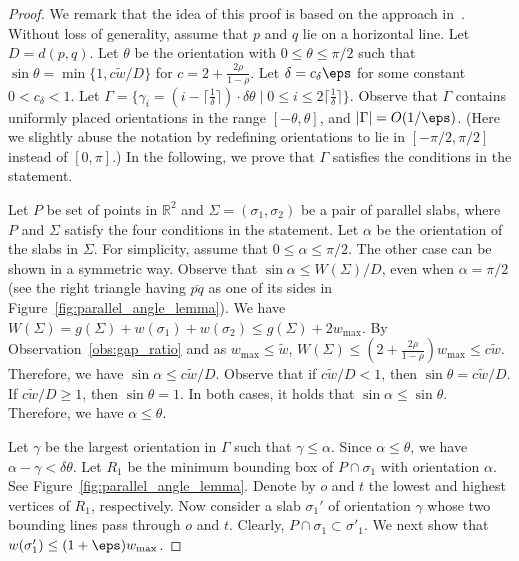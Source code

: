 \begin{proof}
    We remark that the idea of this proof is based on the approach in~\cite{agarwalTwo}.
    Without loss of generality, assume that $p$ and $q$ lie on a horizontal line. 
    Let $D = d(p, q)$. 
    Let $\theta$ be the orientation with $0\le \theta \le \pi/2$ such that $\sin\theta = \min \{1, c \widetilde w/{D} \}$ for $c= 2 + \frac{2\rho}{1-\rho}$.
    Let $\delta =  c_\delta \eps$ for some constant $0 < c_\delta < 1$. 
    Let $\Gamma = \{\gamma_i = (i- \lceil \frac{1}{\delta}\rceil)\cdot \delta\theta  \mid 0 \le i \le 2\lceil \frac{1}{\delta}\rceil \}$.
    Observe that $\Gamma$ contains uniformly placed orientations in the range $[-\theta, \theta]$, and $|\Gamma| = O(1/\eps)$. (Here we slightly abuse the notation by redefining orientations to lie in $[-\pi/2, \pi/2]$ instead of $[0, \pi]$.)
    In the following, we prove that $\Gamma$ satisfies the conditions in the statement.

    Let $P$ be set of points in $\mathbb R^2$ and $\Sigma = (\sigma_1, \sigma_2)$ be a pair of parallel slabs, where $P$ and $\Sigma$ satisfy the four conditions in the statement.
    Let $\alpha$ be the orientation of the slabs in $\Sigma$. 
    For simplicity, assume that $0\le \alpha \le \pi/2$. The other case can be shown in a symmetric way. 
    Observe that $\sin \alpha \le W(\Sigma)/D$, even when $\alpha = \pi/2$ (see the right triangle having $\overline{pq}$ as one of its sides in Figure~\ref{fig:parallel_angle_lemma}).
    We have $W(\Sigma) = g(\Sigma) + w(\sigma_1) + w(\sigma_2) \le g(\Sigma) + 2w_{\max} $. 
    By Observation~\ref{obs:gap_ratio} and as $w_{\max} \le \widetilde w$, $W(\Sigma) \le ( 2 + \frac{2\rho}{1-\rho} ) w_{\max}  \le c \widetilde w$.
    Therefore,
    we have $\sin \alpha \le c \widetilde w /D$.
    Observe that if $ c \widetilde w/ D < 1$, then $\sin \theta =  c \widetilde w/ D$. If $ c \widetilde w/ D \ge 1$, then $\sin \theta =1$. In both cases, it holds that $\sin \alpha \le \sin \theta$. Therefore, we have $\alpha \le \theta$. 
    

     Let $\gamma$ be the largest orientation in $\Gamma$ such that $\gamma \le \alpha$. 
     Since $ \alpha \le  \theta$, we have $\alpha - \gamma < \delta \theta$. 
     Let $R_1$ be the minimum bounding box of $P \cap \sigma_1$ with orientation $\alpha$. See Figure~\ref{fig:parallel_angle_lemma}.
     Denote by $o$ and $t$ the lowest and highest vertices of $R_1$, respectively. 
    Now consider a slab $\sigma_1'$ of orientation $\gamma$ whose two bounding lines pass through $o$ and $t$. 
    Clearly, $P\cap \sigma_1 \subset \sigma'_1$. 
    We next show that $w(\sigma_1') \le (1+\eps)w_{\max}$.


\end{proof}
